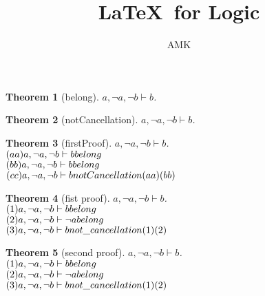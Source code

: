 \documentclass[11pt]{article}
\title{\textbf{\LaTeX\ for Logic}}
\author{AMK}
\newtheorem{theorem}{Theorem}
\def\turn{\vdash}
\begin{document}
\maketitle
\begin{theorem}[belong] $ a, \neg a, \neg b \turn b $.\\
\end{theorem}
\begin{theorem}[notCancellation] $ a, \neg a, \neg b \turn b $.\\
\end{theorem}
\begin{theorem}[firstProof] $ a, \neg a, \neg b \turn b $.\\
$(aa)a, \neg a, \neg b \turn b \hfill belong  $\\
$(bb)a, \neg a, \neg b \turn b \hfill belong  $\\
$(cc)a, \neg a, \neg b \turn b \hfill notCancellation (aa)(bb) $\\
\end{theorem}
\begin{theorem}[fist proof] $ a, \neg a, \neg b \turn b $.\\
$(1)a, \neg a, \neg b \turn b \hfill belong $\\
$(2)a, \neg a, \neg b \turn \neg a \hfill belong $\\
$(3)a, \neg a, \neg b \turn b \hfill not \_ cancellation (1)(2) $\\
\end{theorem}
\begin{theorem}[second proof] $ a, \neg a, \neg b \turn b $.\\
$(1)a, \neg a, \neg b \turn b \hfill belong $\\
$(2)a, \neg a, \neg b \turn \neg a \hfill belong $\\
$(3)a, \neg a, \neg b \turn b \hfill not \_ cancellation (1)(2) $\\
\end{theorem}
\end{document}
